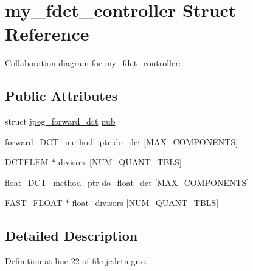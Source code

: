 \hypertarget{structmy__fdct__controller}{}\section{my\+\_\+fdct\+\_\+controller Struct Reference}
\label{structmy__fdct__controller}


Collaboration diagram for my\+\_\+fdct\+\_\+controller\+:
\subsection*{Public Attributes}
\begin{DoxyCompactItemize}
\item 
struct \mbox{\hyperlink{structjpeg__forward__dct}{jpeg\+\_\+forward\+\_\+dct}} \mbox{\hyperlink{structmy__fdct__controller_a233a1343c6fc838dcad3d3dce3a658a0}{pub}}
\item 
forward\+\_\+\+D\+C\+T\+\_\+method\+\_\+ptr \mbox{\hyperlink{structmy__fdct__controller_a4708c82c14bc7a348520824d38f66f06}{do\+\_\+dct}} \mbox{[}\mbox{\hyperlink{jmorecfg_8h_a6d8c910a1fdb6d4762a05f7250e64322}{M\+A\+X\+\_\+\+C\+O\+M\+P\+O\+N\+E\+N\+TS}}\mbox{]}
\item 
\mbox{\hyperlink{jdct_8h_a00460e5dc80a70f254891b5a8abe739f}{D\+C\+T\+E\+L\+EM}} $\ast$ \mbox{\hyperlink{structmy__fdct__controller_a3355de21d37044cf0f08f44938868bde}{divisors}} \mbox{[}\mbox{\hyperlink{jpeglib_8h_ab3254a23612ea48615001fffc0c9f691}{N\+U\+M\+\_\+\+Q\+U\+A\+N\+T\+\_\+\+T\+B\+LS}}\mbox{]}
\item 
float\+\_\+\+D\+C\+T\+\_\+method\+\_\+ptr \mbox{\hyperlink{structmy__fdct__controller_acaf7fa6e7d2647b35436654eb02d9bb3}{do\+\_\+float\+\_\+dct}} \mbox{[}\mbox{\hyperlink{jmorecfg_8h_a6d8c910a1fdb6d4762a05f7250e64322}{M\+A\+X\+\_\+\+C\+O\+M\+P\+O\+N\+E\+N\+TS}}\mbox{]}
\item 
F\+A\+S\+T\+\_\+\+F\+L\+O\+AT $\ast$ \mbox{\hyperlink{structmy__fdct__controller_a3de557b163ea4ed33523ef4fc13dc962}{float\+\_\+divisors}} \mbox{[}\mbox{\hyperlink{jpeglib_8h_ab3254a23612ea48615001fffc0c9f691}{N\+U\+M\+\_\+\+Q\+U\+A\+N\+T\+\_\+\+T\+B\+LS}}\mbox{]}
\end{DoxyCompactItemize}


\subsection{Detailed Description}


Definition at line 22 of file jcdctmgr.\+c.



